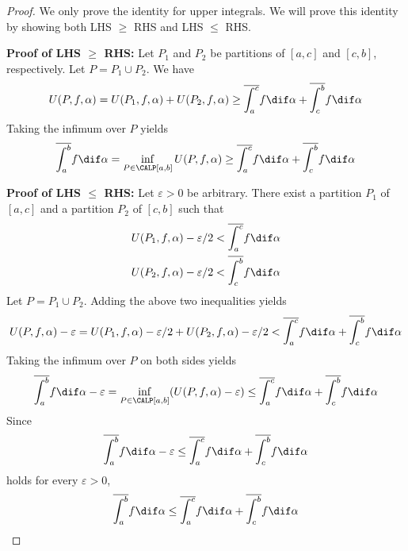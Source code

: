 \documentclass[thmcnt=section, color=blue, 12pt]{my-elegantbook}
\begin{document}
\begin{proof}
	We only prove the identity for upper integrals.
	We will prove this identity by showing both
	LHS $\geq$ RHS and LHS $\leq$ RHS.

	\noindent\textbf{Proof of LHS $\geq$ RHS:}
	Let $P_1$ and $P_2$ be partitions of $[a, c]$ and $[c, b]$, respectively.
	Let $P = P_1 \cup P_2$.
	We have
	\begin{align*}
		U(P, f, \alpha) = U(P_1, f, \alpha) + U(P_2, f, \alpha)
		\geq \overline{\int_a^c} f \dif \alpha + \overline{\int_c^b} f \dif \alpha
	\end{align*}
	Taking the infimum over $P$ yields
	\begin{align*}
		\overline{\int_a^b} f \dif \alpha
		= \inf_{P \in \CALP[a, b]} U(P, f, \alpha)
		\geq \overline{\int_a^c} f \dif \alpha + \overline{\int_c^b} f \dif \alpha
	\end{align*}


	\noindent\textbf{Proof of LHS $\leq$ RHS:}
	Let $\varepsilon > 0$ be arbitrary.
	There exist a partition $P_1$ of $[a, c]$ and a partition $P_2$ of $[c, b]$
	such that
	\begin{align*}
		U(P_1, f, \alpha) - \varepsilon / 2 & < \overline{\int_a^c} f \dif \alpha \\
		U(P_2, f, \alpha) - \varepsilon / 2 & < \overline{\int_c^b} f \dif \alpha
	\end{align*}
	Let $P = P_1 \cup P_2$.
	Adding the above two inequalities yields
	\begin{align*}
		U(P, f, \alpha) - \varepsilon
		= U(P_1, f, \alpha) - \varepsilon/2
		+ U(P_2, f, \alpha) - \varepsilon/2
		< \overline{\int_a^c} f \dif \alpha
		+ \overline{\int_c^b} f \dif \alpha
	\end{align*}
	Taking the infimum over $P$ on both sides yields
	\begin{align*}
		\overline{\int_a^b} f \dif \alpha - \varepsilon
		= \inf_{P \in \CALP[a, b]} (U(P, f, \alpha) - \varepsilon)
		\leq \overline{\int_a^c} f \dif \alpha
		+ \overline{\int_c^b} f \dif \alpha
	\end{align*}
	Since
	\begin{align*}
		\overline{\int_a^b} f \dif \alpha - \varepsilon
		\leq \overline{\int_a^c} f \dif \alpha
		+ \overline{\int_c^b} f \dif \alpha
	\end{align*}
	holds for every $\varepsilon > 0$,
	\begin{align*}
		\overline{\int_a^b} f \dif \alpha
		\leq \overline{\int_a^c} f \dif \alpha
		+ \overline{\int_c^b} f \dif \alpha
	\end{align*}
\end{proof}
\end{document}
